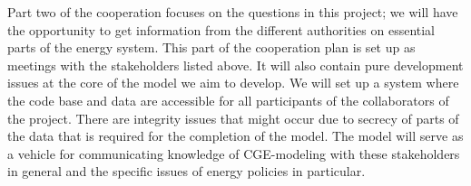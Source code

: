 Part two of the cooperation focuses on the questions in this project; we will have the opportunity to get information from the different authorities on essential parts of the energy system. This part of the cooperation plan is set up as meetings with the stakeholders listed above. It will also contain pure development issues at the core of the model we aim to develop. We will set up a system where the code base and data are accessible for all participants of the collaborators of the project. There are integrity issues that might occur due to secrecy of parts of the data that is required for the completion of the model. The model will serve as a vehicle for communicating knowledge of CGE-modeling with these stakeholders in general and the specific issues of energy policies in particular.
